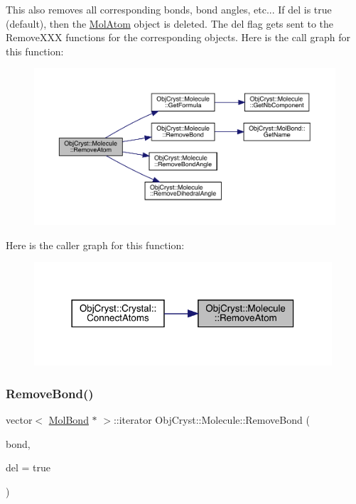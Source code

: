 This also removes all corresponding bonds, bond angles, etc... If del is true (default), then the \mbox{\hyperlink{class_obj_cryst_1_1_mol_atom}{Mol\+Atom}} object is deleted. The del flag gets sent to the Remove\+X\+XX functions for the corresponding objects. Here is the call graph for this function\+:
\nopagebreak
\begin{figure}[H]
\begin{center}
\leavevmode
\includegraphics[width=350pt]{class_obj_cryst_1_1_molecule_a66bbf57cc85b1f5930b922edc3286fae_cgraph}
\end{center}
\end{figure}
Here is the caller graph for this function\+:
\nopagebreak
\begin{figure}[H]
\begin{center}
\leavevmode
\includegraphics[width=314pt]{class_obj_cryst_1_1_molecule_a66bbf57cc85b1f5930b922edc3286fae_icgraph}
\end{center}
\end{figure}
\mbox{\label{class_obj_cryst_1_1_molecule_aa02f2f7cea34333b5ddbb4a16678b7a4}} 
\subsubsection{\texorpdfstring{RemoveBond()}{RemoveBond()}}
{\footnotesize\ttfamily vector$<$ \mbox{\hyperlink{class_obj_cryst_1_1_mol_bond}{Mol\+Bond}} $\ast$ $>$\+::iterator Obj\+Cryst\+::\+Molecule\+::\+Remove\+Bond (\begin{DoxyParamCaption}\item[{const \mbox{\hyperlink{class_obj_cryst_1_1_mol_bond}{Mol\+Bond}} \&}]{bond,  }\item[{const bool}]{del = {\ttfamily true} }\end{DoxyParamCaption})}

